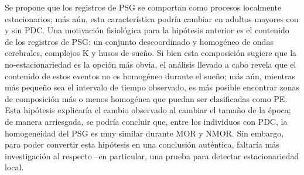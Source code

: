 \documentclass[12pt,a4paper]{mitthesis}
\newtheorem{defn}{Definici\'on}
\newcommand{\intPI}{\int_{-\pi}^{\pi}}
\newcommand{\Cov}[1]{\mathrm{Cov}\left( #1 \right)}
\newcommand{\abso}[1]{\left| #1 \right|}
\begin{document}

Se propone que los registros de PSG se comportan como procesos localmente estacionarios; m\'as 
a\'un, esta caracter\'istica podr\'ia cambiar en adultos mayores con y sin PDC. 
Una motivaci\'on fisiol\'ogica para la hip\'otesis anterior es el contenido de los registros de
PSG: un conjunto descoordinado y homog\'eneo de ondas cerebrales, complejos K y husos de sue\~no.
Si bien esta composici\'on sugiere que la no-estacionariedad es la opci\'on m\'as obvia, el
an\'alisis llevado a cabo revela que el contenido de estos eventos no es homog\'eneo durante el
sue\~no; m\'as a\'un, mientras m\'as peque\~no sea el intervalo de tiempo observado, es m\'as
posible encontrar zonas de composici\'on m\'as o menos homog\'enea que puedan ser clasificadas
como PE.
Esta hip\'otesis explicar\'ia el cambio observado al cambiar el tama\~no de la \'epoca; de manera
arriesgada, se podr\'ia concluir que, entre los individuos con PDC, la homogeneidad del PSG es muy
similar durante MOR y NMOR.
Sin embargo, para poder convertir esta hip\'otesis en una conclusi\'on aut\'entica, faltar\'ia
m\'as investigaci\'on al respecto --en particular, una prueba para detectar estacionariedad local.
\end{document}
